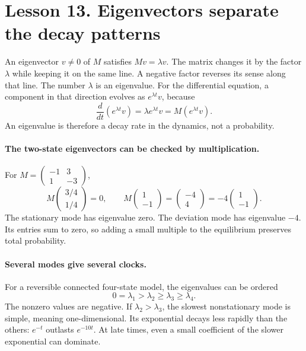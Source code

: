 \documentclass[11pt]{article}
\begin{document}
\clearpage
\section*{Lesson 13. Eigenvectors separate the decay patterns}
An eigenvector $v\ne0$ of $M$ satisfies $Mv=\lambda v$. The matrix changes
it by the factor $\lambda$ while keeping it on the same line. A negative
factor reverses its sense along that line. The number
$\lambda$ is an eigenvalue. For the differential equation, a component in
that direction evolves as $e^{\lambda t}v$, because
\[
\frac{d}{dt}(e^{\lambda t}v)=\lambda e^{\lambda t}v
=M(e^{\lambda t}v).
\]
An eigenvalue is therefore a decay rate in the dynamics, not a probability.

\paragraph{The two-state eigenvectors can be checked by multiplication.}
For $M=\left(\begin{smallmatrix}-1&3\\1&-3\end{smallmatrix}\right)$,
\[
M\begin{pmatrix}3/4\\1/4\end{pmatrix}=0,
\qquad
M\begin{pmatrix}1\\-1\end{pmatrix}
=\begin{pmatrix}-4\\4\end{pmatrix}
=-4\begin{pmatrix}1\\-1\end{pmatrix}.
\]
The stationary mode has eigenvalue zero. The deviation mode has eigenvalue
$-4$. Its entries sum to zero, so adding a small multiple to the equilibrium
preserves total probability.

\paragraph{Several modes give several clocks.}
For a reversible connected four-state model, the eigenvalues can be ordered
\[
0=\lambda_1>\lambda_2\geq\lambda_3\geq\lambda_4.
\]
The nonzero values are negative. If $\lambda_2>\lambda_3$, the slowest
nonstationary mode is simple, meaning one-dimensional. Its exponential
decays less rapidly than the others: $e^{-t}$ outlasts $e^{-10t}$.
At late times, even a small coefficient of the slower exponential can dominate.
\end{document}
